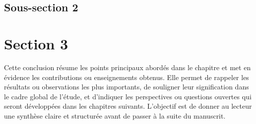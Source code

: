 \lipsum[1-2]%

\subsection{Sous-section 2}\label{subsec:1_2.3}

\lipsum[1-4]%

\section{Section 3}\label{sec:1_3}

\lipsum[1-5]%


\begin{chapbilan}
    Cette conclusion résume les points principaux abordés dans le chapitre et met en évidence les contributions ou enseignements obtenus. Elle permet de rappeler les résultats ou observations les plus importants, de souligner leur signification dans le cadre global de l’étude, et d’indiquer les perspectives ou questions ouvertes qui seront développées dans les chapitres suivants. L’objectif est de donner au lecteur une synthèse claire et structurée avant de passer à la suite du manuscrit.
\end{chapbilan}
